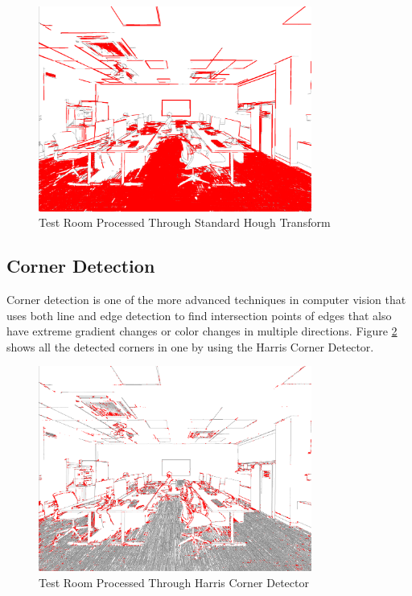 \documentclass[12pt]{report}
\begin{document}
\begin{figure}[H]
    \centering
    \includegraphics[width=0.8\textwidth]{white_lines.png}
    \caption{Test Room Processed Through Standard Hough Transform}
    \label{fig: Test Room Processed through Standard Hough Transform}
\end{figure}

\subsection{Corner Detection}

Corner detection is one of the more advanced techniques in computer vision that uses both line and edge detection to find intersection points of edges that also have extreme gradient changes or color changes in multiple directions. Figure \ref{fig: Test Room Processed through Harris Corner Detector} shows all the detected corners in one by using the Harris Corner Detector.

\begin{figure}[H]
    \centering
    \includegraphics[width=0.8\textwidth]{white_corners.png}
    \caption{Test Room Processed Through Harris Corner Detector}
    \label{fig: Test Room Processed through Harris Corner Detector}
\end{figure}
\end{document}
